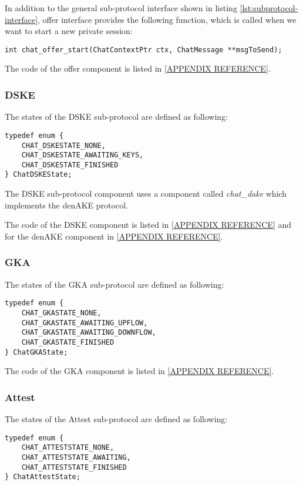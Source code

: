 In addition to the general sub-protocol interface shown in listing \ref{lst:subprotocol-interface}, offer interface provides the following function, which is called when we want to start a new private session:
\begin{lstlisting}[caption={Offer specific interface}]
int chat_offer_start(ChatContextPtr ctx, ChatMessage **msgToSend);
\end{lstlisting}

The code of the offer component is listed in \ref{APPENDIX REFERENCE}.

\subsubsection{DSKE}
The states of the DSKE sub-protocol are defined as following:
\begin{lstlisting}[caption={DSKE states}]
typedef enum {
	CHAT_DSKESTATE_NONE,
	CHAT_DSKESTATE_AWAITING_KEYS,
	CHAT_DSKESTATE_FINISHED
} ChatDSKEState;
\end{lstlisting}

The DSKE sub-protocol component uses a component called \emph{chat\_dake} which implements the denAKE protocol.

The code of the DSKE component is listed in \ref{APPENDIX REFERENCE} and for the denAKE component in \ref{APPENDIX REFERENCE}.

\subsubsection{GKA}
The states of the GKA sub-protocol are defined as following:
\begin{lstlisting}[caption={GKA states}]
typedef enum {
    CHAT_GKASTATE_NONE,
    CHAT_GKASTATE_AWAITING_UPFLOW,
    CHAT_GKASTATE_AWAITING_DOWNFLOW,
    CHAT_GKASTATE_FINISHED
} ChatGKAState;
\end{lstlisting}

The code of the GKA component is listed in \ref{APPENDIX REFERENCE}.

\subsubsection{Attest}
The states of the Attest sub-protocol are defined as following:
\begin{lstlisting}[caption={Attest states}]
typedef enum {
    CHAT_ATTESTSTATE_NONE,
    CHAT_ATTESTSTATE_AWAITING,
    CHAT_ATTESTSTATE_FINISHED
} ChatAttestState;
\end{lstlisting}

